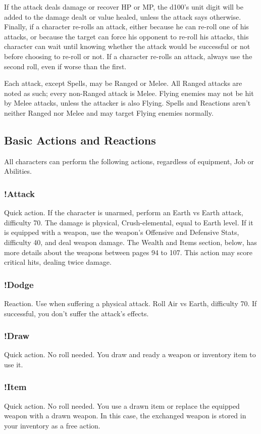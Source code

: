 \begin{multicols}{2}
If the attack deals damage or recover HP or
MP, the d100’s unit digit will be added to the
damage dealt or value healed, unless the attack
says otherwise. Finally, if a character re-rolls an
attack, either because he can re-roll one of his
attacks, or because the target can force his
opponent to re-roll his attacks, this character can
wait until knowing whether the attack would be
successful or not before choosing to re-roll or not.
If a character re-rolls an attack, always use the
second roll, even if worse than the first.

Each attack, except Spells, may be Ranged
or Melee. All Ranged attacks are noted as such;
every non-Ranged attack is Melee. Flying enemies
may not be hit by Melee attacks, unless the
attacker is also Flying. Spells and Reactions aren't
neither Ranged nor Melee and may target Flying
enemies normally.

\subsection{Basic Actions and Reactions}
All characters can perform the following
actions, regardless of equipment, Job or Abilities.

\subsubsection{!Attack}
Quick action. If the character is unarmed,
perform an Earth vs Earth attack, difficulty 70. The
damage is physical, Crush-elemental, equal to
Earth level. If it is equipped with a weapon, use the
weapon’s Offensive and Defensive Stats, difficulty
40, and deal weapon damage. The Wealth and
Items section, below, has more details about the
weapons between pages 94 to 107. This action
may score critical hits, dealing twice damage.

\subsubsection{!Dodge}
Reaction. Use when suffering a physical
attack. Roll Air vs Earth, difficulty 70. If successful,
you don’t suffer the attack’s effects.

\subsubsection{!Draw}
Quick action. No roll needed. You draw and
ready a weapon or inventory item to use it.

\subsubsection{!Item}
Quick action. No roll needed. You use a
drawn item or replace the equipped weapon with
a drawn weapon. In this case, the exchanged
weapon is stored in your inventory as a free action.


\end{multicols}
